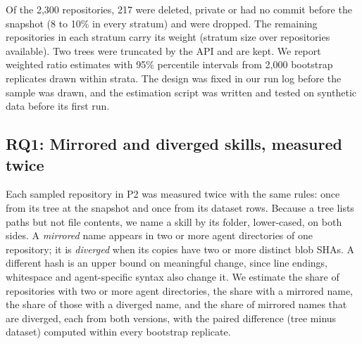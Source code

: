 Of the 2,300 repositories, 217 were deleted, private or had no commit before the snapshot (8 to 10\% in every
stratum) and were dropped. The remaining repositories in each stratum carry its weight (stratum size over
repositories available).
Two trees were truncated by the API and are kept. We report weighted ratio estimates with 95\% percentile intervals
from 2,000 bootstrap replicates drawn within strata. The design was fixed in our run log before the sample was drawn,
and the estimation script was written and tested on synthetic data before its first run.

\subsection{RQ1: Mirrored and diverged skills, measured twice}
\label{sec:rq1method}

Each sampled repository in P2 was measured twice with the same rules: once from its tree at the snapshot and once
from its dataset rows. Because a tree lists paths but not file contents, we name a skill by its folder,
lower-cased, on both sides. A \emph{mirrored} name appears in two or more agent directories of one repository; it is
\emph{diverged} when its copies have two or more distinct blob SHAs. A different hash is an upper bound on meaningful
change, since line endings, whitespace and agent-specific syntax also change it. We estimate the share of
repositories with two or more agent directories, the share with a mirrored name, the share of those with a diverged
name, and the share of mirrored names that are diverged, each from both versions, with the paired difference
(tree minus dataset) computed within every bootstrap replicate.
